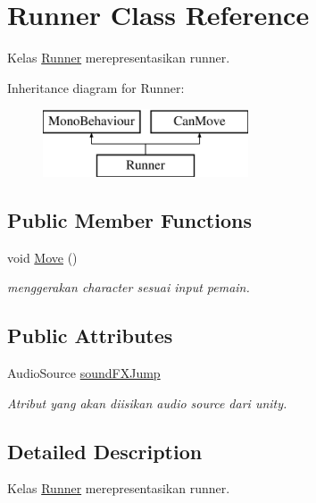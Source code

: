 \hypertarget{class_runner}{}\section{Runner Class Reference}
\label{class_runner}


Kelas \hyperlink{class_runner}{Runner} merepresentasikan runner.  


Inheritance diagram for Runner\+:\begin{figure}[H]
\begin{center}
\leavevmode
\includegraphics[height=2.000000cm]{class_runner}
\end{center}
\end{figure}
\subsection*{Public Member Functions}
\begin{DoxyCompactItemize}
\item 
void \hyperlink{class_runner_add0c89849fa2e023ed488ba80c7daf4a}{Move} ()
\begin{DoxyCompactList}\small\item\em menggerakan character sesuai input pemain. \end{DoxyCompactList}\end{DoxyCompactItemize}
\subsection*{Public Attributes}
\begin{DoxyCompactItemize}
\item 
Audio\+Source \hyperlink{class_runner_a7480846642a3f6ed85a33479d93a46eb}{sound\+F\+X\+Jump}
\begin{DoxyCompactList}\small\item\em Atribut yang akan diisikan audio source dari unity. \end{DoxyCompactList}\end{DoxyCompactItemize}


\subsection{Detailed Description}
Kelas \hyperlink{class_runner}{Runner} merepresentasikan runner. 



